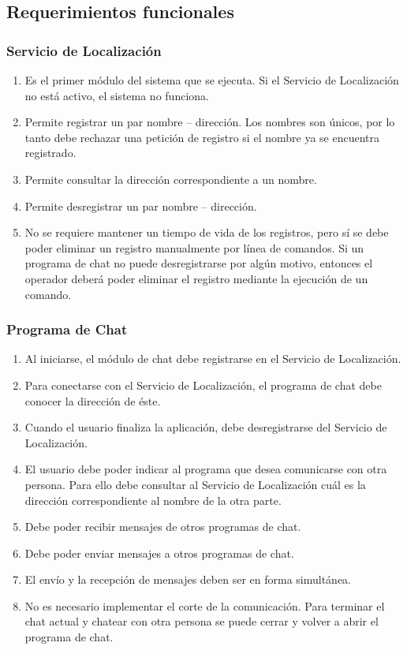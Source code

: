 \subsection*{Requerimientos funcionales}

\subsubsection*{Servicio de Localización}
\begin{enumerate}
  \item Es el primer módulo del sistema que se ejecuta.  Si el Servicio de Localización no está activo, el sistema no funciona.
  \item Permite registrar un par nombre – dirección.  Los nombres son únicos, por lo tanto debe rechazar una petición de registro si el nombre ya se encuentra registrado.
  \item Permite consultar la dirección correspondiente a un nombre.
  \item Permite desregistrar un par nombre – dirección.
  \item No se requiere mantener un tiempo de vida de los registros, pero sí se debe poder eliminar un registro manualmente por línea de comandos.  Si un programa de chat no puede desregistrarse por algún motivo, entonces el operador deberá poder eliminar el registro mediante la ejecución de un comando.
\end{enumerate}

\subsubsection*{Programa de Chat}
\begin{enumerate}
  \item Al iniciarse, el módulo de chat debe registrarse en el Servicio de Localización.
  \item Para conectarse con el Servicio de Localización, el programa de chat debe conocer la dirección de éste.
  \item Cuando el usuario finaliza la aplicación, debe desregistrarse del Servicio de Localización.
  \item El usuario debe poder indicar al programa que desea comunicarse con otra persona.  Para ello debe consultar al Servicio de Localización cuál es la dirección correspondiente al nombre de la otra parte.
  \item Debe poder recibir mensajes de otros programas de chat.
  \item	Debe poder enviar mensajes a otros programas de chat.
  \item El envío y la recepción de mensajes deben ser en forma simultánea.
  \item No es necesario implementar el corte de la comunicación.  Para terminar el chat actual y chatear con otra persona se puede cerrar y volver a abrir el programa de chat.
\end{enumerate}

